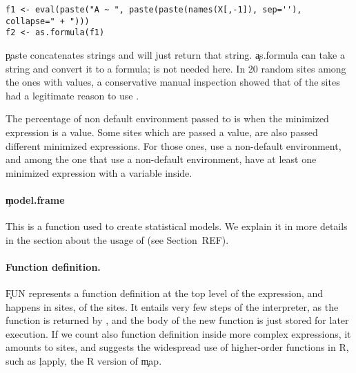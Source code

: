 \documentclass[screen,acmsmall]{acmart}
\begin{document}
\begin{lstlisting}
f1 <- eval(paste("A ~ ", paste(paste(names(X[,-1]), sep=''), collapse=" + ")))
f2 <- as.formula(f1)
\end{lstlisting}

\c{paste} concatenates strings and \eval will just return that string. \c{as.formula} can take a string and convert it to a formula; \eval is not needed here. In 20 random sites among the ones with values, a conservative manual inspection showed that \packageUsefulValueEvalPercent of the sites  had a  legitimate reason to use \eval.

The percentage of non default environment passed to \eval is \packageMinimizedpercentenvirc when the minimized expression is a value. Some sites which are passed a value, are also passed different minimized expressions. For those ones, \packageNonDefaultEnvirValuePercent use a non-default environment, and among the one that use a non-default environment, \packageNonDefaultEnvirWithVarPercent have at least one minimized expression with a variable inside.


\paragraph{\c{model.frame}} This is a function used to create statistical models. We explain it in more details in the section about the usage of \eval (see Section~REF).

\paragraph{Function definition.} \c{FUN} represents a function definition at the top level of the expression, and happens in \packageFunctionDefinitionSites sites, \ie \packageFunctionDefinitionSitesPercent of the sites. It entails very few steps of the interpreter, as the function is returned by \eval, and the body of the new function is just stored for later execution. If we count also function definition inside more complex expressions, it amounts to \packageGeneralizedFunctionDefinitionSites sites, \ie \packageGeneralizedFunctionDefinitionSitesPercent and suggests the widespread use of higher-order functions in R, such as \c{lapply}, the R version of \c{map}.
\end{document}
